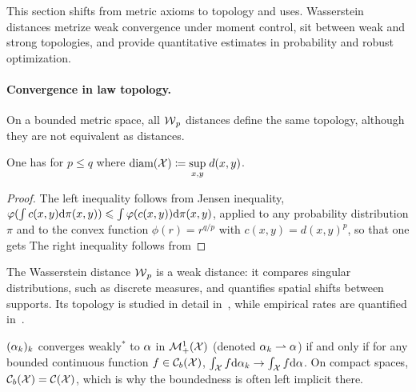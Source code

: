 This section shifts from metric axioms to topology and uses. Wasserstein distances metrize weak convergence under moment control, sit between weak and strong topologies, and provide quantitative estimates in probability and robust optimization.

\paragraph{Convergence in law topology.}

On a bounded metric space, all $\operatorname{\mathcal{W}}_p$ distances define the same topology, although they are not equivalent as distances.

\begin{prop}\label{prop-comp-wass-p}
	One has for $p \leq q$
	where $\text{\upshape diam}(\mathcal{X}) \coloneqq \underset{x,y}{\sup}\; d(x,y)$.
\end{prop}
\begin{proof}
		The left inequality follows from Jensen inequality, $\varphi(\int c(x,y) \mathrm{d}\pi(x,y)) \leqslant \int \varphi(c(x,y)) \mathrm{d}\pi(x,y)$, applied to any probability distribution $\pi$ and to the convex function $\phi(r)=r^{q/p}$ with $c(x,y)=d(x,y)^p$, so that one gets
		The right inequality follows from
	\end{proof}

The Wasserstein distance $\operatorname{\mathcal{W}}_p$ is a weak distance: it compares singular distributions, such as discrete measures, and quantifies spatial shifts between supports. Its topology is studied in detail in~\cite{Villani09,SantambrogioBook,gigli2011user}, while empirical rates are quantified in~\cite{dudley1969speed,fournier2015rate,weed2017sharp,boissard2015distribution,bolley2007quantitative}.

\begin{defn}\label{dfn-weak-conv}
	$(\alpha_k)_k$ converges weakly$^*$ to $\alpha$ in $\mathcal{M}_+^1(\mathcal{X})$ (denoted $\alpha_k \rightharpoonup \alpha$) if and only if for any bounded continuous function $f \in \mathcal{C}_b(\mathcal{X})$, $\int_{\mathcal{X}} f \mathrm{d}\alpha_k \rightarrow \int_{\mathcal{X}} f \mathrm{d}\alpha$. On compact spaces, $\mathcal{C}_b(\mathcal{X})=\mathcal{C}(\mathcal{X})$, which is why the boundedness is often left implicit there.
\end{defn}

